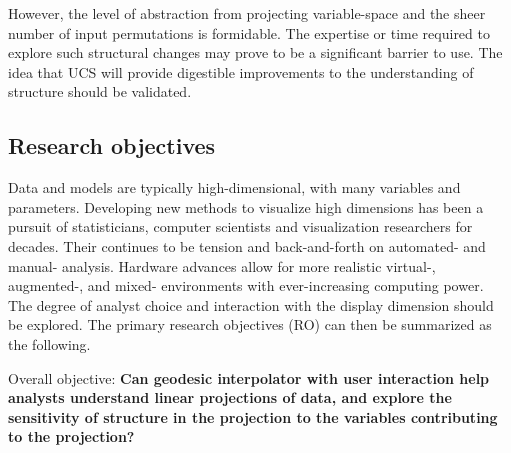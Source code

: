 \documentclass[
  11,
]{article}
\begin{document}
However, the level of abstraction from projecting variable-space and the sheer number of input permutations is formidable. The expertise or time required to explore such structural changes may prove to be a significant barrier to use. The idea that UCS will provide digestible improvements to the understanding of structure should be validated.

\hypertarget{research-objectives}{%
\subsection{Research objectives}\label{research-objectives}}

Data and models are typically high-dimensional, with many variables and parameters. Developing new methods to visualize high dimensions has been a pursuit of statisticians, computer scientists and visualization researchers for decades. Their continues to be tension and back-and-forth on automated- and manual- analysis. Hardware advances allow for more realistic virtual-, augmented-, and mixed- environments with ever-increasing computing power. The degree of analyst choice and interaction with the display dimension should be explored. The primary research objectives (RO) can then be summarized as the following.

Overall objective: \textbf{Can geodesic interpolator with user interaction help analysts understand linear projections of data, and explore the sensitivity of structure in the projection to the variables contributing to the projection? }
\end{document}
